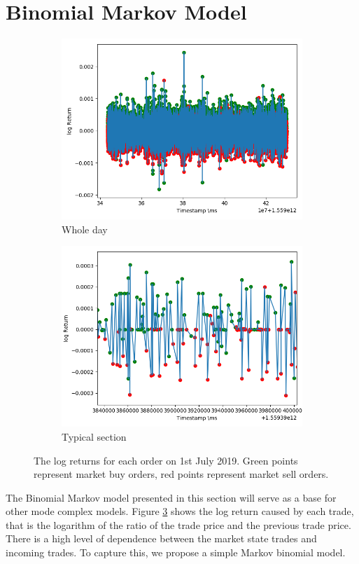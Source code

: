 \documentclass[a4paper,10pt]{article}
\begin{document}
\section{Binomial Markov Model}
\begin{figure}[h]
    \centering
    \begin{subfigure}[b]{0.45\textwidth}
        \includegraphics[width=\textwidth]{images/log_returns_per_trade}
        \caption{Whole day}
        \label{fig:log_returns}
    \end{subfigure}
    \begin{subfigure}[b]{0.45\textwidth}
        \includegraphics[width=\textwidth]{images/log_returns_per_trade_zoom}
        \caption{Typical section}
        \label{fig:log_returns_zoom}
    \end{subfigure}
    \caption{The log returns for each order on 1st July 2019. Green points represent market buy orders, red points represent market sell orders.}
    \label{log_returns}
\end{figure}
The Binomial Markov model presented in this section will serve as a base for other mode complex models. Figure \ref{log_returns} shows the log return caused by each trade, that is the logarithm of the ratio of the trade price and the previous trade price. There is a high level of dependence between the market state trades and incoming trades. To capture this, we propose a simple Markov binomial model. 
\end{document}
